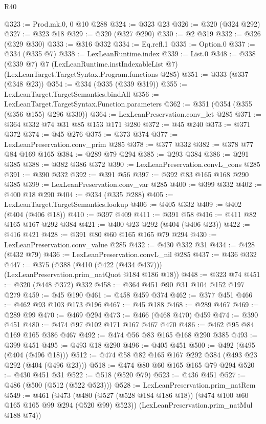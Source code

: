 \begin{lexlean}{R40}
\begin{coremodule}
@323 := Prod.mk.{0, 0} @10 @288
@324 := @323 @23
@326 := @320 (@324 @292)
@327 := @323 @18
@329 := @320 (@327 @290)
@330 := @2 @319
@332 := @326 (@329 @330)
@333 := @316 @332
@334 := Eq.refl.{1}
@335 := Option.{0}
@337 := @334 (@335 @7)
@338 := LexLeanRuntime.index
@339 := List.{0}
@348 := @338
    (@339 @7)
    @7
    (LexLeanRuntime.instIndexableList @7)
    (LexLeanTarget.TargetSyntax.Program.functions @285)
@351 := @333 (@337 (@348 @23))
@354 := @334 (@335 (@339 @319))
@355 := LexLeanTarget.TargetSemantics.bindAll
@356 := LexLeanTarget.TargetSyntax.Function.parameters
@362 := @351 (@354 (@355 (@356 @155) @296 @330))
@364 := LexLeanPreservation.conv_let @285
@371 := @364 @332 @74 @31 @85 @153 @171 @280
@372 := @45 @240
@373 := @371 @372
@374 := @45 @276
@375 := @373 @374
@377 := LexLeanPreservation.conv_prim @285
@378 := @377 @332
@382 := @378 @77 @84 @169 @165
@384 := @289 @79 @294
@385 := @293 @384
@386 := @291 @385
@388 := @382 @386 @372
@390 := LexLeanPreservation.convL_cons @285
@391 := @390 @332
@392 := @391 @56
@397 := @392 @83 @165 @168 @290 @385
@399 := LexLeanPreservation.conv_var @285
@400 := @399 @332
@402 := @400 @18 @290
@404 := @334 (@335 @288)
@405 := LexLeanTarget.TargetSemantics.lookup
@406 := @405 @332
@409 := @402 (@404 (@406 @18))
@410 := @397 @409
@411 := @391 @58
@416 := @411 @82 @165 @167 @292 @384
@421 := @400 @23 @292 (@404 (@406 @23))
@422 := @416 @421
@428 := @391 @80 @60 @165 @165 @79 @294
@430 := LexLeanPreservation.conv_value @285
@432 := @430 @332 @31
@434 := @428 (@432 @79)
@436 := LexLeanPreservation.convL_nil @285
@437 := @436 @332
@447 := @375 (@388 (@410 (@422 (@434 @437))) (LexLeanPreservation.prim_natQuot @184 @186 @18))
@448 := @323 @74
@451 := @320 (@448 @372) @332
@458 := @364 @451 @90 @31 @104 @152 @197 @279
@459 := @45 @190
@461 := @458 @459 @374
@462 := @377 @451
@466 := @462 @93 @103 @173 @196
@467 := @45 @188
@468 := @289 @467
@469 := @289 @99
@470 := @469 @294
@473 := @466 (@468 @470) @459
@474 := @390 @451
@480 := @474 @97 @102 @171 @167 @467 @470
@486 := @462 @95 @84 @169 @165 @386 @467
@492 := @474 @56 @83 @165 @168 @290 @385
@493 := @399 @451
@495 := @493 @18 @290
@496 := @405 @451
@500 := @492 (@495 (@404 (@496 @18)))
@512 := @474 @58 @82 @165 @167 @292 @384 (@493 @23 @292 (@404 (@496 @23)))
@518 := @474 @80 @60 @165 @165 @79 @294
@520 := @430 @451 @31
@522 := @518 (@520 @79)
@523 := @436 @451
@527 := @486 (@500 (@512 (@522 @523)))
@528 := LexLeanPreservation.prim_natRem
@549 := @461
    (@473
      (@480 (@527 (@528 @184 @186 @18)) (@474 @100 @60 @165 @165 @99 @294 (@520 @99) @523))
      (LexLeanPreservation.prim_natMul @188 @74))

\end{coremodule}
\end{lexlean}
